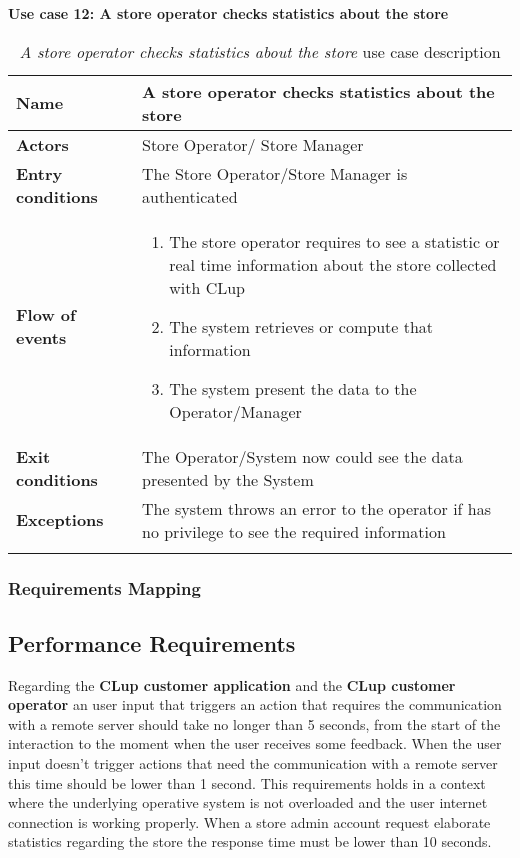     \clearpage
    \textbf{Use case 12: A store operator checks statistics about the store}
    \smallskip
    \begin{longtable}{p{0.25\linewidth}p{0.75\linewidth}}
    \toprule
    \textbf{Name} & \textbf{A store operator checks statistics about the store} \\
    \midrule
    \textbf{Actors} & Store Operator/ Store Manager\\
    \midrule
    \textbf{Entry conditions} & The Store Operator/Store Manager is authenticated\\
    \midrule
    \textbf{Flow of events} & 
    \begin{enumerate}
        \item The store operator requires to see a statistic or real time information about the store collected with CLup
        \item The system retrieves or compute that information
        \item The system present the data to the Operator/Manager 
    \end{enumerate} \\
    \midrule
    \textbf{Exit conditions} & The Operator/System now could see the data presented by the System\\
    \midrule
    \textbf{Exceptions} & The system throws an error to the operator if has no privilege to see the required information \\
    \bottomrule
    \caption{\emph{A store operator checks statistics about the store} use case description}
    \end{longtable}


\subsubsection{Requirements Mapping}
\subsection{Performance Requirements}
    Regarding the \textbf{CLup customer application} and the \textbf{CLup customer operator}  an user input that triggers an action that requires the communication with a remote server should take no longer than 5 seconds, from the start of the interaction to the moment when the user receives some feedback. When the user input doesn't trigger actions that need the communication with a remote server this time should be lower than 1 second. This requirements holds in a context where the underlying operative system is not overloaded and the user internet connection is working properly.
    \smallskip
    When a store admin account request elaborate statistics regarding the store the response time must be lower than 10 seconds. 
